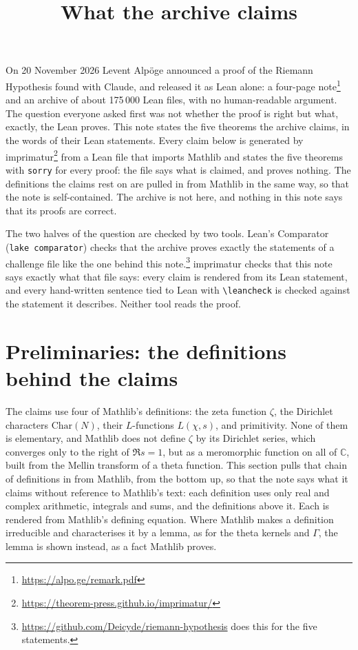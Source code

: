 \documentclass{article}
\title{What the archive claims}
\author{}
\date{}
\begin{document}
\maketitle

On 20 November 2026 Levent Alp\"oge announced a proof of the Riemann
Hypothesis found with Claude, and released it as Lean alone: a four-page
note\footnote{\url{https://alpo.ge/remark.pdf}} and an archive of about
175\,000 Lean files, with no human-readable argument. The question everyone
asked first was not whether the proof is right but what, exactly, the Lean
proves. This note states the five theorems the archive claims, in the words
of their Lean statements. Every claim below is generated by
imprimatur\footnote{\url{https://theorem-press.github.io/imprimatur/}} from a
Lean file that imports Mathlib and states the five theorems with
\texttt{sorry} for every proof: the file says what is claimed, and proves
nothing. The definitions the claims rest on are pulled in from Mathlib in
the same way, so that the note is self-contained. The archive is not here, and nothing in this note says that its
proofs are correct.

The two halves of the question are checked by two tools. Lean's Comparator
(\texttt{lake comparator}) checks that the archive proves exactly the
statements of a challenge file like the one behind this
note.\footnote{\url{https://github.com/Deicyde/riemann-hypothesis} does
this for the five statements.} imprimatur checks that this note says exactly
what that file says: every claim is rendered from its Lean statement, and
every hand-written sentence tied to Lean with \verb|\leancheck| is checked
against the statement it describes. Neither tool reads the proof.

\section{Preliminaries: the definitions behind the claims}

The claims use four of Mathlib's definitions: the zeta function $\zeta$, the
Dirichlet characters $\mathrm{Char}(N)$, their $L$-functions $L(\chi, s)$,
and primitivity. None of them is elementary, and Mathlib does not define
$\zeta$ by its Dirichlet series, which converges only to the right of
$\Re s = 1$, but as a meromorphic function on all of $\mathbb{C}$, built from
the Mellin transform of a theta function. This section pulls that chain of
definitions in from Mathlib, from the bottom up, so that the note says what
it claims without reference to Mathlib's text: each definition uses only
real and complex arithmetic, integrals and sums, and the definitions above
it. Each is rendered from Mathlib's defining equation. Where Mathlib makes a
definition irreducible and characterises it by a lemma, as for the theta
kernels and $\Gamma$, the lemma is shown instead, as a fact Mathlib proves.
\end{document}
